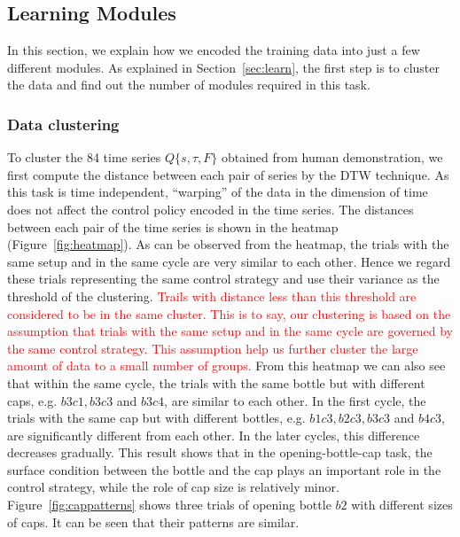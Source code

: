 \subsection{Learning Modules}
\label{learning}

In this section, we explain how we encoded the training data into just
a few different modules. As explained in Section~\ref{sec:learn}, the
first step is to cluster the data and find out the number of modules
required in this task.

\subsubsection{Data clustering}
To cluster the 84 time series $Q\{s,\tau,F\}$ obtained from human
demonstration, we first compute the distance between each pair of
series by the DTW technique. As this task is time independent,
``warping'' of the data in the dimension of time does not affect the
control policy encoded in the time series. The distances between each
pair of the time series is shown in the heatmap
(Figure~\ref{fig:heatmap}). As can be observed from the heatmap, the
trials with the same setup and in the same cycle are very similar to
each other. Hence we regard these trials representing the same control
strategy and use their variance as the threshold of the
clustering. \textcolor{red}{Trails with distance less than this threshold are considered to be in the same cluster. This is to say, our clustering is based on the assumption that trials with the same setup and in the same cycle are governed by the same control strategy. This assumption help us further cluster the large amount of data to a small number of groups.} From this heatmap we can also see that within the same
cycle, the trials with the same bottle but with different caps,
e.g. $b3c1, b3c3$ and $b3c4$, are similar to each other. In the first
cycle, the trials with the same cap but with different bottles,
e.g. $b1c3, b2c3, b3c3$ and $b4c3$, are significantly different from
each other. In the later cycles, this difference decreases
gradually. This result shows that in the opening-bottle-cap task, the
surface condition between the bottle and the cap plays an important
role in the control strategy, while the role of cap size is relatively
minor. Figure~\ref{fig:cappatterns} shows three trials of opening
bottle $b2$ with different sizes of caps. It can be seen that their
patterns are similar.

